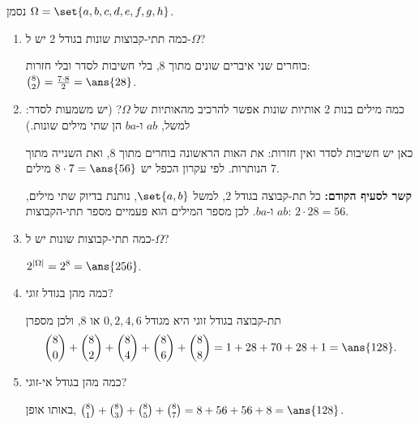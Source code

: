 נסמן $\Omega=\set{a,b,c,d,e,f,g,h}$.
\begin{enumerate}
\item כמה תתי-קבוצות שונות בגודל 2 יש ל-$\Omega$?
\begin{solbox}
בוחרים שני איברים שונים מתוך 8, בלי חשיבות לסדר ובלי חזרות: $\binom82=\frac{7\cdot8}2=\ans{28}$.
\end{solbox}
\item כמה מילים בנות 2 אותיות שונות אפשר להרכיב מהאותיות של $\Omega$? (יש משמעות לסדר: למשל, $ab$ ו-$ba$ הן שתי מילים שונות.)
\begin{solbox}
כאן יש חשיבות לסדר ואין חזרות: את האות הראשונה בוחרים מתוך 8, ואת השנייה מתוך 7 הנותרות. לפי עקרון הכפל יש $8\cdot7=\ans{56}$ מילים.

\textbf{קשר לסעיף הקודם:} כל תת-קבוצה בגודל 2, למשל $\set{a,b}$, נותנת בדיוק שתי מילים, $ab$ ו-$ba$. לכן מספר המילים הוא פעמיים מספר תתי-הקבוצות: $2\cdot28=56$.
\end{solbox}
\item כמה תתי-קבוצות שונות יש ל-$\Omega$?
\begin{solbox}
$2^{|\Omega|}=2^8=\ans{256}$.
\end{solbox}
\item כמה מהן בגודל זוגי?
\begin{solbox}
תת-קבוצה בגודל זוגי היא מגודל $0,2,4,6$ או $8$, ולכן מספרן
\[
\binom80+\binom82+\binom84+\binom86+\binom88=1+28+70+28+1=\ans{128}.
\]
\end{solbox}
\item כמה מהן בגודל אי-זוגי?
\begin{solbox}
באותו אופן, $\binom81+\binom83+\binom85+\binom87=8+56+56+8=\ans{128}$.
\end{solbox}
\end{enumerate}
